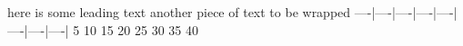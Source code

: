 here is some leading text another piece
of text to be wrapped %
----|----|----|----|----|----|----|----|
   5   10   15   20   25   30   35   40